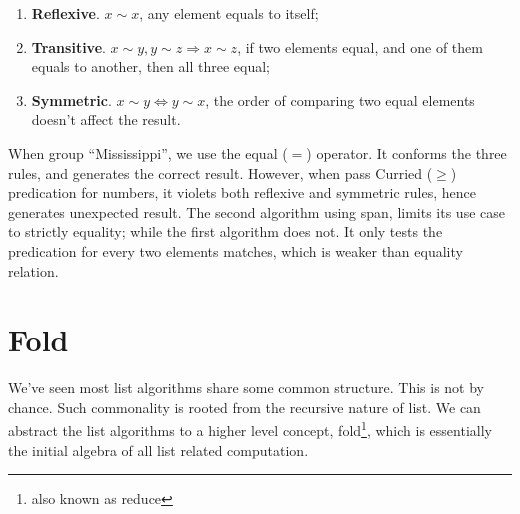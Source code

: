 \documentclass[b5paper]{article}
\begin{document}
\begin{enumerate}
\item \textbf{Reflexive}. $x \sim x$, any element equals to itself;
\item \textbf{Transitive}. $x \sim y, y \sim z \Rightarrow x \sim z$, if two elements equal, and one of them equals to another, then all three equal;
\item \textbf{Symmetric}. $x \sim y \Leftrightarrow y \sim x$, the order of comparing two equal elements doesn't affect the result.
\end{enumerate}

When group ``Mississippi'', we use the equal ($=$) operator. It conforms the three rules, and generates the correct result. However, when pass Curried ($\geq$) predication for numbers, it violets both reflexive and symmetric rules, hence generates unexpected result. The second algorithm using span, limits its use case to strictly equality; while the first algorithm does not. It only tests the predication for every two elements matches, which is weaker than equality relation.

\begin{Exercise}
\end{Exercise}

\section{Fold}
 \label{sec:fold}

We've seen most list algorithms share some common structure. This is not by chance. Such commonality is rooted from the recursive nature of list. We can abstract the list algorithms to a higher level concept, fold\footnote{also known as reduce}, which is essentially the initial algebra of all list related computation\cite{unplugged}.
\end{document}
